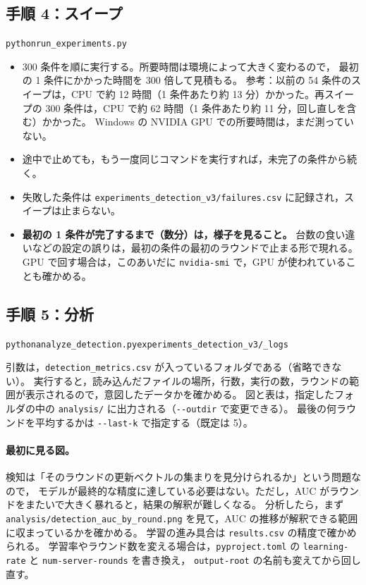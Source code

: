 \documentclass[a4j, dvipdfmx]{jsarticle}  %
\newenvironment{cmd}{\par\vspace{0.3em}\begin{alltt}\small}{\end{alltt}\vspace{0.3em}\par}
\begin{document}
\subsection{手順 4：スイープ}

\begin{cmd}
python run_experiments.py
\end{cmd}

\begin{itemize}
  \item 300 条件を順に実行する。所要時間は環境によって大きく変わるので，
        最初の 1 条件にかかった時間を 300 倍して見積もる。
        参考：以前の 54 条件のスイープは，CPU で約 12 時間（1 条件あたり約 13 分）かかった。再スイープの 300 条件は，CPU で約 62 時間（1 条件あたり約 11 分，回し直しを含む）かかった。
        Windows の NVIDIA GPU での所要時間は，まだ測っていない。
  \item 途中で止めても，もう一度同じコマンドを実行すれば，未完了の条件から続く。
  \item 失敗した条件は \texttt{experiments\_detection\_v3/failures.csv} に記録され，スイープは止まらない。
  \item \textbf{最初の 1 条件が完了するまで（数分）は，様子を見ること。}
        台数の食い違いなどの設定の誤りは，最初の条件の最初のラウンドで止まる形で現れる。
        GPU で回す場合は，このあいだに \texttt{nvidia-smi} で，GPU が使われていることも確かめる。
\end{itemize}

\subsection{手順 5：分析}

\begin{cmd}
python analyze_detection.py experiments_detection_v3/_logs
\end{cmd}

引数は，\texttt{detection\_metrics.csv} が入っているフォルダである（省略できない）。
実行すると，読み込んだファイルの場所，行数，実行の数，ラウンドの範囲が表示されるので，意図したデータかを確かめる。
図と表は，指定したフォルダの中の \texttt{analysis/} に出力される（\texttt{-{}-outdir} で変更できる）。
最後の何ラウンドを平均するかは \texttt{-{}-last-k} で指定する（既定は 5）。

\paragraph{最初に見る図。}
検知は「そのラウンドの更新ベクトルの集まりを見分けられるか」という問題なので，
モデルが最終的な精度に達している必要はない。ただし，AUC がラウンドをまたいで大きく暴れると，結果の解釈が難しくなる。
分析したら，まず \texttt{analysis/detection\_auc\_by\_round.png} を見て，AUC の推移が解釈できる範囲に収まっているかを確かめる。
学習の進み具合は \texttt{results.csv} の精度で確かめられる。
学習率やラウンド数を変える場合は，\texttt{pyproject.toml} の \texttt{learning-rate} と \texttt{num-server-rounds} を書き換え，
\texttt{output-root} の名前も変えてから回し直す。
\end{document}
